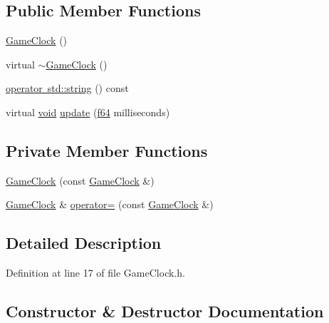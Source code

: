 \subsection*{Public Member Functions}
\begin{DoxyCompactItemize}
\item 
\mbox{\hyperlink{classnjli_1_1_game_clock_a6eca9b59f7e983c3719b21a72afcba36}{Game\+Clock}} ()
\item 
virtual \mbox{\hyperlink{classnjli_1_1_game_clock_a03a8daae8d83735fde3e88792a4739fb}{$\sim$\+Game\+Clock}} ()
\item 
\mbox{\hyperlink{classnjli_1_1_game_clock_a1ab93f24f3738afd3c22bd7f048f3196}{operator std\+::string}} () const
\item 
virtual \mbox{\hyperlink{_thread_8h_af1e856da2e658414cb2456cb6f7ebc66}{void}} \mbox{\hyperlink{classnjli_1_1_game_clock_a9eef69cf52e3b8591db5718c1c438618}{update}} (\mbox{\hyperlink{_util_8h_a94dab5770726ccbef8c7d026cfbdf8e5}{f64}} milliseconds)
\end{DoxyCompactItemize}
\subsection*{Private Member Functions}
\begin{DoxyCompactItemize}
\item 
\mbox{\hyperlink{classnjli_1_1_game_clock_afe3c4dab3ee3c43690cac84a98ee29a8}{Game\+Clock}} (const \mbox{\hyperlink{classnjli_1_1_game_clock}{Game\+Clock}} \&)
\item 
\mbox{\hyperlink{classnjli_1_1_game_clock}{Game\+Clock}} \& \mbox{\hyperlink{classnjli_1_1_game_clock_a169ce8985a8bc4adfe7cc4515538eeed}{operator=}} (const \mbox{\hyperlink{classnjli_1_1_game_clock}{Game\+Clock}} \&)
\end{DoxyCompactItemize}


\subsection{Detailed Description}


Definition at line 17 of file Game\+Clock.\+h.



\subsection{Constructor \& Destructor Documentation}
\mbox{\label{classnjli_1_1_game_clock_a6eca9b59f7e983c3719b21a72afcba36}} 
